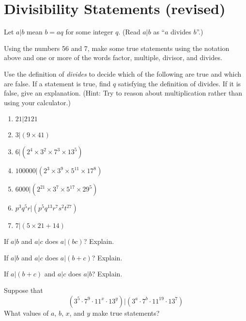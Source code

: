 \newpage
\section{Divisibility Statements (revised)}\label{A:divisibilityStatements}

Let $a|b$ mean $b=aq$ for some integer $q$.  (Read $a|b$ as ``$a$ divides $b$''.)  

\begin{prob}
Using the numbers 56 and 7, make some true statements using the notation above and one or more of the words factor, multiple, divisor, and divides.  
\end{prob}

\begin{prob}
Use the definition of \emph{divides} to decide which of the following are true and which are false.  If a statement is true, find $q$ satisfying the definition of divides.  If it is false, give an explanation.  (Hint:  Try to reason about multiplication rather than using your calculator.)
\begin{enumerate}
\item $21|2121$
\item $3|(9\times 41)$
\item $6|(2^4\times 3^2\times 7^3\times 13^5)$
\item $100000|(2^3\times 3^9\times 5^{11}\times 17^8)$
\item $6000|(2^{21}\times 3^7 \times 5^{17}\times 29^5)$
\item $p^3q^5r|(p^5q^{13}r^7s^2t^{27})$
\item $7|(5\times 21 + 14)$
\end{enumerate}
\end{prob}

\begin{prob}
If $a|b$ and $a|c$ does $a|(bc)$?  Explain. 
\end{prob}

\begin{prob}
If $a|b$ and $a|c$ does $a|(b+c)$?  Explain.  
\end{prob}

\begin{prob}
If $a|(b+c)$ and $a|c$ does $a|b$?  Explain.  
\end{prob}

\begin{prob}
Suppose that $$(3^5\cdot 7^9\cdot 11^x\cdot 13^y)|(3^a\cdot 7^b\cdot 11^{19}\cdot 13^7)$$
What values of $a$, $b$, $x$, and $y$ make true statements? 
\end{prob}

